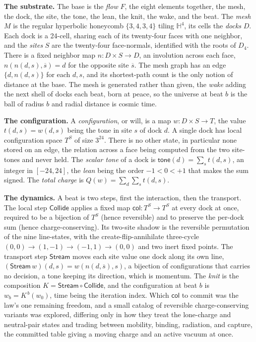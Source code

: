 \textbf{The substrate.} The base is the \emph{flow} $F$, the eight elements together, the mesh, the dock, the site, the tone, the lean, the knit, the wake, and the beat. The \emph{mesh} $M$ is the regular hyperbolic honeycomb $\{3,4,3,4\}$ tiling $\mathbb{H}^4$, its cells the \emph{docks} $D$. Each dock is a 24-cell, sharing each of its twenty-four faces with one neighbor, and the \emph{sites} $S$ are the twenty-four face-normals, identified with the roots of $D_4$. There is a fixed neighbor map $n : D \times S \to D$, an involution across each face, $n(n(d,s), \overline{s}) = d$ for the opposite site $\overline{s}$. The mesh graph has an edge $\{d, n(d,s)\}$ for each $d, s$, and its shortest-path count is the only notion of distance at the base. The mesh is generated rather than given, the \emph{wake} adding the next shell of docks each beat, born at peace, so the universe at beat $b$ is the ball of radius $b$ and radial distance is cosmic time.

\textbf{The configuration.} A \emph{configuration}, or will, is a map $w : D \times S \to T$, the value $t(d,s) = w(d,s)$ being the tone in site $s$ of dock $d$. A single dock has local configuration space $T^{S}$ of size $3^{24}$. There is no other state, in particular none stored on an edge, the relation across a face being computed from the two site-tones and never held. The \emph{scalar tone} of a dock is $\mathsf{tone}(d) = \sum_{s} t(d,s)$, an integer in $[-24, 24]$, the \emph{lean} being the order $-1 < 0 < +1$ that makes the sum signed. The \emph{total charge} is $Q(w) = \sum_{d} \sum_{s} t(d,s)$.

\textbf{The dynamics.} A beat is two steps, first the interaction, then the transport. The local step $\mathsf{Collide}$ applies a fixed map $\mathsf{col} : T^{S} \to T^{S}$ at every dock at once, required to be a bijection of $T^{S}$ (hence reversible) and to preserve the per-dock sum (hence charge-conserving). Its two-site shadow is the reversible permutation of the nine line-states, with the create-flip-annihilate three-cycle $(0,0) \to (1,-1) \to (-1,1) \to (0,0)$ and two inert fixed points. The transport step $\mathsf{Stream}$ moves each site value one dock along its own line, $(\mathsf{Stream}\,w)(d,s) = w(n(d,\overline{s}), s)$, a bijection of configurations that carries no decision, a tone keeping its direction, which is momentum. The \emph{knit} is the composition $K = \mathsf{Stream} \circ \mathsf{Collide}$, and the configuration at beat $b$ is $w_b = K^{\,b}(w_0)$, time being the iteration index. Which $\mathsf{col}$ to commit was the law's one remaining freedom, and a small catalog of reversible charge-conserving variants was explored, differing only in how they treat the lone-charge and neutral-pair states and trading between mobility, binding, radiation, and capture, the committed table giving a moving charge and an active vacuum at once.

